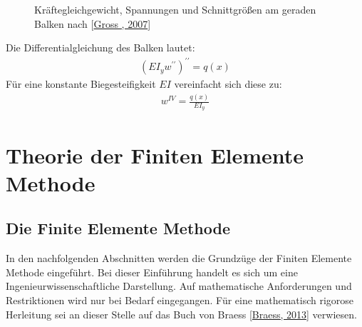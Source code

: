 \documentclass[letterpaper,10pt,german]{jupyterBook}
\let\sphinxpxdimen\pdfpxdimen\else\newdimen\sphinxpxdimen
\begin{document}
\begin{figure}[htbp]
\centering
\capstart

\noindent\sphinxincludegraphics[width=600\sphinxpxdimen]{{Balken_TM2}.png}
\caption{Kräftegleichgewicht, Spannungen und Schnittgrößen am geraden Balken nach {[}\hyperlink{cite.quellen:id13}{Gross , 2007}{]}}\label{\detokenize{chapters/chapter1/strukturgleichungen:balken}}\end{figure}

\sphinxAtStartPar
Die Differentialgleichung des Balken lautet:
\begin{equation}\label{equation:chapters/chapter1/strukturgleichungen:balkendgl}
\begin{split} \left(E I_y w^{\prime \prime}\right)^{\prime\prime} =  q(x)\end{split}
\end{equation}
\sphinxAtStartPar
Für eine konstante Biegesteifigkeit \(EI\) vereinfacht sich diese zu:
\begin{equation}\label{equation:chapters/chapter1/strukturgleichungen:balkendglsimple}
\begin{split}  w^{IV} =  \frac{q(x)}{E I_y}\end{split}
\end{equation}
\sphinxstepscope


\part{Theorie der Finiten Elemente Methode}

\sphinxstepscope


\chapter{Die Finite Elemente Methode}
\label{\detokenize{chapters/chapter2/overview:die-finite-elemente-methode}}\label{\detokenize{chapters/chapter2/overview::doc}}
\sphinxAtStartPar
In den nachfolgenden Abschnitten werden die Grundzüge der Finiten Elemente Methode eingeführt. Bei dieser Einführung handelt es sich um eine Ingenieurwissenschaftliche Darstellung. Auf mathematische Anforderungen und Restriktionen wird nur bei Bedarf eingegangen. Für eine mathematisch rigorose Herleitung sei an dieser Stelle auf das Buch von Braess {[}\hyperlink{cite.quellen:id14}{Braess, 2013}{]} verwiesen.

\sphinxstepscope
\end{document}
